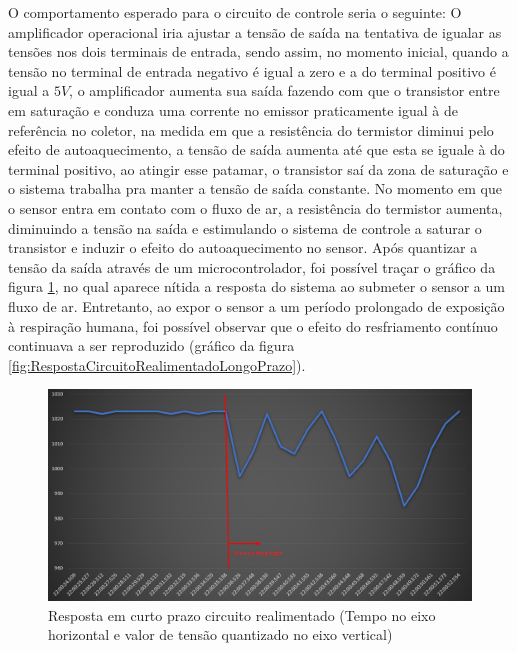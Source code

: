 O comportamento esperado para o circuito de controle seria o seguinte: O amplificador operacional iria ajustar a tensão de saída na tentativa de igualar as tensões nos dois terminais de entrada, sendo assim, no momento inicial, quando a tensão no terminal de entrada negativo é igual a zero e a do terminal positivo é igual a $5V$, o amplificador aumenta sua saída fazendo com que o transistor entre em saturação e conduza uma corrente no emissor praticamente igual à de referência no coletor, na medida em que a resistência do termistor diminui pelo efeito de autoaquecimento, a tensão de saída aumenta até que esta se iguale à do terminal positivo, ao atingir esse patamar, o transistor saí da zona de saturação e o sistema trabalha pra manter a tensão de saída constante. No momento em que o sensor entra em contato com o fluxo de ar, a resistência do termistor aumenta, diminuindo a tensão na saída e estimulando o sistema de controle a saturar o transistor e induzir o efeito do autoaquecimento no sensor. Após quantizar a tensão da saída através de um microcontrolador, foi possível traçar o gráfico da figura \ref{fig:RespostaCircuitoRealimentado}, no qual aparece nítida a resposta do sistema ao submeter o sensor a um fluxo de ar. Entretanto, ao expor o sensor a um período prolongado de exposição à respiração humana, foi possível observar que o efeito do resfriamento contínuo continuava a ser reproduzido (gráfico da figura \ref{fig:RespostaCircuitoRealimentadoLongoPrazo}).


\begin{figure}[h!]
	\begin{center}
		\includegraphics[width=1\linewidth]{images/RespostaCircuitoRealimentado.png}
		\caption{Resposta em curto prazo circuito realimentado (Tempo no eixo horizontal e valor de tensão quantizado no eixo vertical)}
		\label{fig:RespostaCircuitoRealimentado}
	\end{center}
\end{figure}


